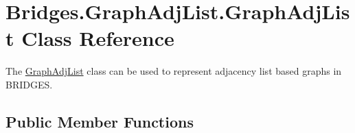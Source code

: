 \hypertarget{class_bridges_1_1_graph_adj_list_1_1_graph_adj_list}{}\section{Bridges.\+Graph\+Adj\+List.\+Graph\+Adj\+List Class Reference}
\label{class_bridges_1_1_graph_adj_list_1_1_graph_adj_list}


The \mbox{\hyperlink{class_bridges_1_1_graph_adj_list_1_1_graph_adj_list}{Graph\+Adj\+List}} class can be used to represent adjacency list based graphs in B\+R\+I\+D\+G\+ES.  


\subsection*{Public Member Functions}

